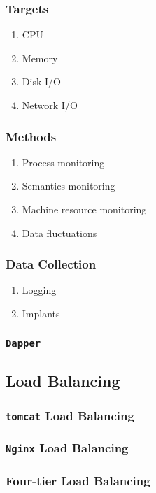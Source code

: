 \documentclass[11pt, twocolumn]{article}
\begin{document}
\subsubsection{Targets}
\begin{enumerate}
	\item CPU
	\item Memory
	\item Disk I/O
	\item Network I/O
\end{enumerate}

\subsubsection{Methods}
\begin{enumerate}
	\item Process monitoring
	\item Semantics monitoring
	\item Machine resource monitoring
	\item Data fluctuations
\end{enumerate}

\subsubsection{Data Collection}
\begin{enumerate}
	\item Logging
	\item Implants
\end{enumerate}

\subsubsection{\texttt{Dapper}}

\subsection{Load Balancing}

\subsubsection{\texttt{tomcat} Load Balancing}

\subsubsection{\texttt{Nginx} Load Balancing}

\subsubsection{Four-tier Load Balancing}
\end{document}
